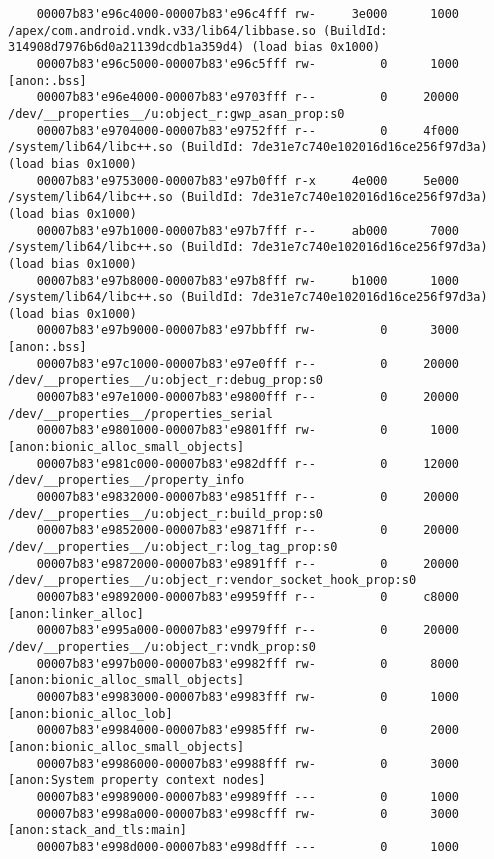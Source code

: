 \begin{lstlisting}
    00007b83'e96c4000-00007b83'e96c4fff rw-     3e000      1000  /apex/com.android.vndk.v33/lib64/libbase.so (BuildId: 314908d7976b6d0a21139dcdb1a359d4) (load bias 0x1000)
    00007b83'e96c5000-00007b83'e96c5fff rw-         0      1000  [anon:.bss]
    00007b83'e96e4000-00007b83'e9703fff r--         0     20000  /dev/__properties__/u:object_r:gwp_asan_prop:s0
    00007b83'e9704000-00007b83'e9752fff r--         0     4f000  /system/lib64/libc++.so (BuildId: 7de31e7c740e102016d16ce256f97d3a) (load bias 0x1000)
    00007b83'e9753000-00007b83'e97b0fff r-x     4e000     5e000  /system/lib64/libc++.so (BuildId: 7de31e7c740e102016d16ce256f97d3a) (load bias 0x1000)
    00007b83'e97b1000-00007b83'e97b7fff r--     ab000      7000  /system/lib64/libc++.so (BuildId: 7de31e7c740e102016d16ce256f97d3a) (load bias 0x1000)
    00007b83'e97b8000-00007b83'e97b8fff rw-     b1000      1000  /system/lib64/libc++.so (BuildId: 7de31e7c740e102016d16ce256f97d3a) (load bias 0x1000)
    00007b83'e97b9000-00007b83'e97bbfff rw-         0      3000  [anon:.bss]
    00007b83'e97c1000-00007b83'e97e0fff r--         0     20000  /dev/__properties__/u:object_r:debug_prop:s0
    00007b83'e97e1000-00007b83'e9800fff r--         0     20000  /dev/__properties__/properties_serial
    00007b83'e9801000-00007b83'e9801fff rw-         0      1000  [anon:bionic_alloc_small_objects]
    00007b83'e981c000-00007b83'e982dfff r--         0     12000  /dev/__properties__/property_info
    00007b83'e9832000-00007b83'e9851fff r--         0     20000  /dev/__properties__/u:object_r:build_prop:s0
    00007b83'e9852000-00007b83'e9871fff r--         0     20000  /dev/__properties__/u:object_r:log_tag_prop:s0
    00007b83'e9872000-00007b83'e9891fff r--         0     20000  /dev/__properties__/u:object_r:vendor_socket_hook_prop:s0
    00007b83'e9892000-00007b83'e9959fff r--         0     c8000  [anon:linker_alloc]
    00007b83'e995a000-00007b83'e9979fff r--         0     20000  /dev/__properties__/u:object_r:vndk_prop:s0
    00007b83'e997b000-00007b83'e9982fff rw-         0      8000  [anon:bionic_alloc_small_objects]
    00007b83'e9983000-00007b83'e9983fff rw-         0      1000  [anon:bionic_alloc_lob]
    00007b83'e9984000-00007b83'e9985fff rw-         0      2000  [anon:bionic_alloc_small_objects]
    00007b83'e9986000-00007b83'e9988fff rw-         0      3000  [anon:System property context nodes]
    00007b83'e9989000-00007b83'e9989fff ---         0      1000
    00007b83'e998a000-00007b83'e998cfff rw-         0      3000  [anon:stack_and_tls:main]
    00007b83'e998d000-00007b83'e998dfff ---         0      1000

\end{lstlisting}
